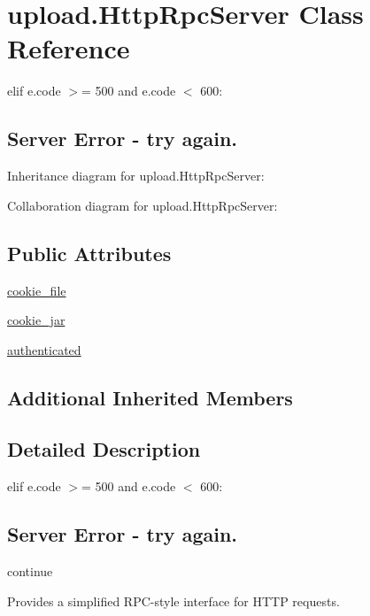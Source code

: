 \hypertarget{classupload_1_1_http_rpc_server}{}\section{upload.\+Http\+Rpc\+Server Class Reference}
\label{classupload_1_1_http_rpc_server}


elif e.\+code $>$= 500 and e.\+code $<$ 600\+: \subsection*{Server Error -\/ try again.} 




Inheritance diagram for upload.\+Http\+Rpc\+Server\+:


Collaboration diagram for upload.\+Http\+Rpc\+Server\+:
\subsection*{Public Attributes}
\begin{DoxyCompactItemize}
\item 
\hyperlink{classupload_1_1_http_rpc_server_ad5c1a730c030f9d3b5f70c2e0d8b9a1d}{cookie\+\_\+file}
\item 
\hyperlink{classupload_1_1_http_rpc_server_a1b9c9af7f0a46afd84a9d524782323bf}{cookie\+\_\+jar}
\item 
\hyperlink{classupload_1_1_http_rpc_server_aaa356e2491537dd0d4bfc5b1bb0fec96}{authenticated}
\end{DoxyCompactItemize}
\subsection*{Additional Inherited Members}


\subsection{Detailed Description}
elif e.\+code $>$= 500 and e.\+code $<$ 600\+: \subsection*{Server Error -\/ try again.}

continue \begin{DoxyVerb}Provides a simplified RPC-style interface for HTTP requests.\end{DoxyVerb}
 

